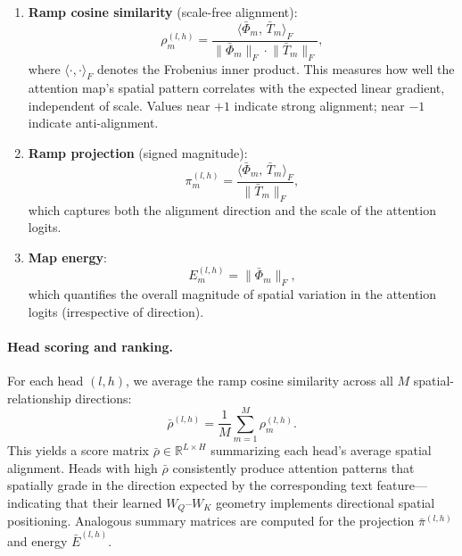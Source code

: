 \documentclass[10pt,twocolumn,letterpaper]{article}
\begin{document}
\begin{enumerate}
    \item \textbf{Ramp cosine similarity} (scale-free alignment):
    \begin{equation}
        \rho_m^{(l,h)} = \frac{\langle \bar{\Phi}_m,\, \bar{T}_m \rangle_F}{\lVert \bar{\Phi}_m \rVert_F \cdot \lVert \bar{T}_m \rVert_F},
        \label{eq:ramp-cosine}
    \end{equation}
    where $\langle \cdot, \cdot \rangle_F$ denotes the Frobenius inner product. This measures how well the attention map's spatial pattern correlates with the expected linear gradient, independent of scale. Values near $+1$ indicate strong alignment; near $-1$ indicate anti-alignment.

    \item \textbf{Ramp projection} (signed magnitude):
    \begin{equation}
        \pi_m^{(l,h)} = \frac{\langle \bar{\Phi}_m,\, \bar{T}_m \rangle_F}{\lVert \bar{T}_m \rVert_F},
    \end{equation}
    which captures both the alignment direction and the scale of the attention logits.

    \item \textbf{Map energy}:
    \begin{equation}
        E_m^{(l,h)} = \lVert \bar{\Phi}_m \rVert_F,
    \end{equation}
    which quantifies the overall magnitude of spatial variation in the attention logits (irrespective of direction).
\end{enumerate}

\paragraph{Head scoring and ranking.}
For each head $(l, h)$, we average the ramp cosine similarity across all $M$ spatial-relationship directions:
\begin{equation}
    \bar{\rho}^{(l,h)} = \frac{1}{M} \sum_{m=1}^{M} \rho_m^{(l,h)}.
    \label{eq:head-score}
\end{equation}
This yields a score matrix $\bar{\rho} \in \mathbb{R}^{L \times H}$ summarizing each head's average spatial alignment. Heads with high $\bar{\rho}$ consistently produce attention patterns that spatially grade in the direction expected by the corresponding text feature---indicating that their learned $W_Q$--$W_K$ geometry implements directional spatial positioning. Analogous summary matrices are computed for the projection $\bar{\pi}^{(l,h)}$ and energy $\bar{E}^{(l,h)}$.
\end{document}

